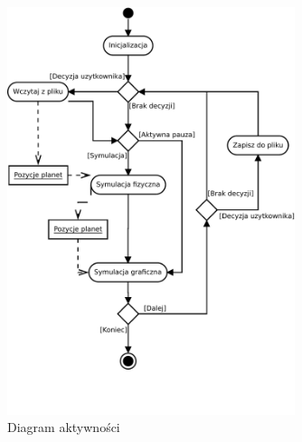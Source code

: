 \begin{figure}[h]
	\centering
	\includegraphics[width=0.75\textwidth]{activity.pdf}
	\caption{Diagram aktywności}
	\label{fig:activity}
\end{figure}


